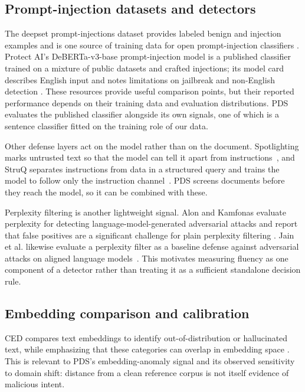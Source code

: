 \subsection{Prompt-injection datasets and detectors}
The deepset prompt-injections dataset provides labeled benign and injection
examples and is one source of training data for open prompt-injection
classifiers \cite{deepset2024dataset}. Protect AI's DeBERTa-v3-base
prompt-injection model is a published classifier trained on a mixture of
public datasets and crafted injections; its model card describes English
input and notes limitations on jailbreak and non-English detection
\cite{protectai2024deberta}. These resources provide useful comparison
points, but their reported performance depends on their training data and
evaluation distributions. PDS evaluates the published classifier alongside
its own signals, one of which is a sentence classifier fitted on the training
role of our data.

Other defense layers act on the model rather than on the document.
Spotlighting marks untrusted text so that the model can tell it apart from
instructions~\cite{hines2024spotlighting}, and StruQ separates instructions from
data in a structured query and trains the model to follow only the instruction
channel~\cite{chen2025struq}. PDS screens documents before they reach the
model, so it can be combined with these.

Perplexity filtering is another lightweight signal. Alon and Kamfonas
evaluate perplexity for detecting language-model-generated adversarial
attacks and report that false positives are a significant challenge for
plain perplexity filtering \cite{alon2023perplexity}. Jain et al. likewise
evaluate a perplexity filter as a baseline defense against adversarial attacks
on aligned language models~\cite{jain2023baseline}. This motivates
measuring fluency as one component of a detector rather than treating it as
a sufficient standalone decision rule.

\subsection{Embedding comparison and calibration}
CED compares text embeddings to identify out-of-distribution or hallucinated
text, while emphasizing that these categories can overlap in embedding space
\cite{lee2024ced}. This is relevant to PDS's embedding-anomaly signal and
its observed sensitivity to domain shift: distance from a clean reference
corpus is not itself evidence of malicious intent.

